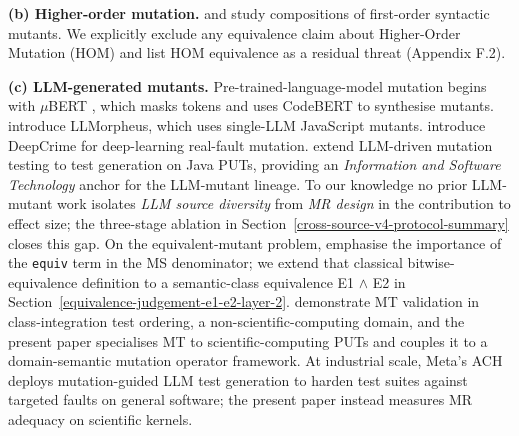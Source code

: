\documentclass[manuscript,screen,review]{acmart}
\begin{document}
\textbf{(b) Higher-order mutation.} \citet{jia2009hom} and \citet{kintis2018effective}
study compositions of first-order syntactic mutants. We
explicitly exclude any equivalence claim about Higher-Order Mutation
(HOM) and list HOM equivalence as a residual threat (Appendix F.2).

\textbf{(c) LLM-generated mutants.} Pre-trained-language-model mutation
begins with $\mu$BERT \citep{degiovanni2022mubert}, which masks tokens
and uses CodeBERT to synthesise mutants. \citet{tip2025llmorpheus}
introduce LLMorpheus, which uses single-LLM JavaScript mutants.
\citet{humbatova2021deepcrime} introduce DeepCrime for
deep-learning real-fault mutation. \citet{dakhel2024llm} extend
LLM-driven mutation testing to test generation on Java PUTs, providing
an \emph{Information and Software Technology} anchor for the LLM-mutant
lineage. To our knowledge no prior LLM-mutant work isolates \emph{LLM
source diversity} from \emph{MR design} in the contribution to effect
size; the three-stage ablation in Section~\ref{cross-source-v4-protocol-summary} closes this gap. On the
equivalent-mutant problem, \citet{delgadoperez2020equivalent} emphasise
the importance of the \texttt{equiv} term in the MS denominator; we
extend that classical bitwise-equivalence definition to a semantic-class
equivalence E1 $\wedge$ E2 in Section~\ref{equivalence-judgement-e1-e2-layer-2}. \citet{zhang2021classintegration} demonstrate MT
validation in class-integration test ordering, a
non-scientific-computing domain, and the present paper specialises MT to
scientific-computing PUTs and couples it to a domain-semantic mutation
operator framework. At industrial scale, Meta's ACH
\citep{foster2025ach} deploys mutation-guided LLM test generation to
harden test suites against targeted faults on general software; the
present paper instead measures MR adequacy on scientific kernels.
\end{document}
